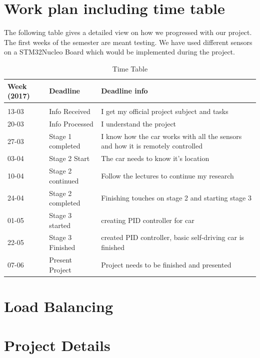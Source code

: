 \documentclass[a4paper,notitlepage]{article}
\begin{document}
\section*{Work plan including time table}

The following table gives a detailed view on how we progressed with our project. The first weeks of the semester are meant testing. We have used different sensors on a STM32Nucleo Board which would be implemented during the project.

\begin{table}[h]
\centering
\begin{tabular}{ l | p{3cm} | p{6cm} }
	
	{\bf{Week (2017)}} & {\bf{Deadline}} & {\bf{Deadline info}} \\
	\hline
	&&\\
	13-03 & Info Received & I get my official project subject and tasks \\
	20-03 & Info Processed & I understand the project \\
	27-03 & Stage 1 completed & I know how the car works with all the sensors and how it is remotely controlled \\
	03-04 & Stage 2 Start & The car needs to know it's location\\
	10-04 & Stage 2 continued & Follow the lectures to continue my research\\
	24-04 & Stage 2 completed & Finishing touches on stage 2 and starting stage 3\\
	01-05 & Stage 3 started & creating PID controller for car\\
	22-05 & Stage 3 Finished & created PID controller, basic self-driving car is finished\\ 
	07-06 & Present Project & Project needs to be finished and presented\\
\end{tabular}
\caption{Time Table}
\end{table}

\section*{Load Balancing}

\section*{Project Details}
\end{document}
